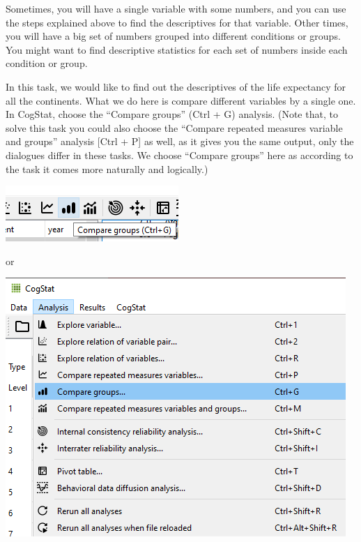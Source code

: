 \documentclass[
]{book}
\begin{document}
Sometimes, you will have a single variable with some numbers, and you can use the steps explained above to find the descriptives for that variable. Other times, you will have a big set of numbers grouped into different conditions or groups. You might want to find descriptive statistics for each set of numbers inside each condition or group.

In this task, we would like to find out the descriptives of the life expectancy for all the continents. What we do here is compare different variables by a single one. In CogStat, choose the ``Compare groups'' (Ctrl + G) analysis. (Note that, to solve this task you could also choose the ``Compare repeated measures variable and groups'' analysis {[}Ctrl + P{]} as well, as it gives you the same output, only the dialogues differ in these tasks. We choose ``Compare groups'' here as according to the task it comes more naturally and logically.)

\includegraphics{img/ch2/compareg.png}

or

\includegraphics{img/ch2/compareg2.png}
\end{document}
